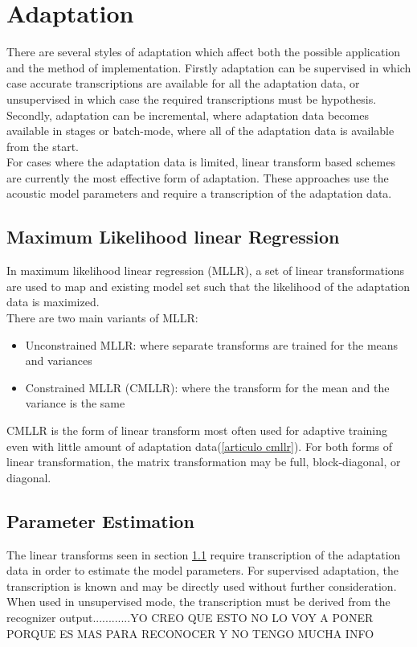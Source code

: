 \section{Adaptation}\label{badapt}
There are several styles of adaptation which affect both the possible application and the method of implementation. Firstly adaptation can be supervised in which case accurate transcriptions are available for all the adaptation data, or unsupervised in which case the required transcriptions must be hypothesis. Secondly, adaptation can be incremental, where adaptation data becomes available in stages or batch-mode, where all of the adaptation data is available from the start.\\
For cases where the adaptation data is limited, linear transform based schemes are currently the most effective form of adaptation. These approaches use the acoustic model parameters and require a transcription of the adaptation data.
\subsection{Maximum Likelihood linear Regression}\label{mllr}
In maximum likelihood linear regression (MLLR), a set of linear transformations are used to map and existing model set such that the likelihood of the adaptation data is maximized.\\
There are two main variants of MLLR:
\begin{itemize}
	\item Unconstrained MLLR: where separate transforms are trained for the means and variances
	\item Constrained MLLR (CMLLR): where the transform for the mean and the variance is the same
\end{itemize}
CMLLR is the form of linear transform most often used for adaptive training even with little amount of adaptation data(\ref{articulo cmllr}). For both forms of linear transformation, the matrix transformation may be full, block-diagonal, or diagonal.
\subsection{Parameter Estimation}\label{pe}
The linear transforms seen in section \ref{mllr}  require transcription of the adaptation data in order to estimate the model parameters. For supervised adaptation, the transcription is known and may be directly used without further consideration. When used in unsupervised mode, the transcription must be derived from the recognizer output............YO CREO QUE ESTO NO LO VOY A PONER PORQUE ES MAS PARA RECONOCER Y NO TENGO MUCHA INFO
